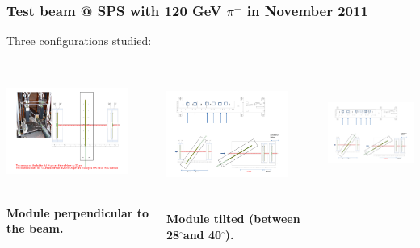 \documentclass{beamer}
\newcommand{\degres}{\ensuremath{^\circ}}
\begin{document}
  \begin{frame}
    \frametitle{Test beam @ SPS with 120 GeV $\pi^-$ in November 2011}


    \vspace{-0.1cm}
    Three configurations studied:

    \vspace{-0.1cm}
    \begin{columns}[t]
      \begin{column}{4cm}
        \begin{center}
          \includegraphics[width = 4cm,height = 3.9cm]{Pictures/tb_cern_11_sketch_normal.pdf}

          \footnotesize{\textbf{Module perpendicular to the beam.}}
        \end{center}
      \end{column}

      \begin{column}{4cm}
        \begin{center}
          \includegraphics[width = 4cm,height = 4.1cm]{Pictures/tb_cern_11_sketch_tilted.pdf}

          \vspace{-0.2cm}
          \footnotesize{\textbf{Module tilted (between 28\degres and 40\degres).}}
        \end{center}
      \end{column}

      \begin{column}{4cm}
        \begin{center}
          \includegraphics[width = 4cm,height = 4.0cm]{Pictures/tb_cern_11_sketch_tilted120mm.pdf}


\end{center}
\end{column}
\end{columns}
\end{frame}
\end{document}
